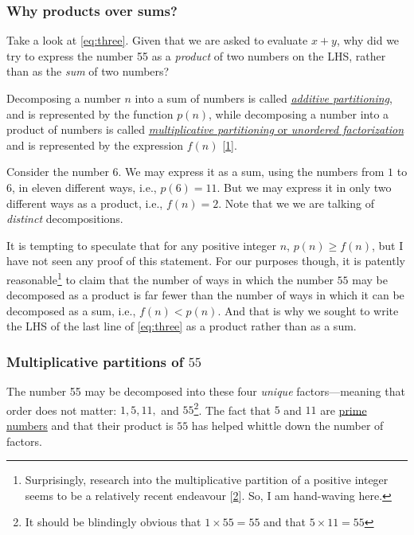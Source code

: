 \documentclass[
  a4paper,
]{article}
\begin{document}
\hypertarget{why-products-over-sums}{%
\subsubsection{Why products over sums?}\label{why-products-over-sums}}

Take a look at \cref{eq:three}. Given that we are asked to evaluate
\(x + y\), why did we try to express the number 55 as a \emph{product}
of two numbers on the LHS, rather than as the \emph{sum} of two numbers?

Decomposing a number \(n\) into a sum of numbers is called
\href{https://mathworld.wolfram.com/Partition.html}{\emph{additive
partitioning}}, and is represented by the function \(p(n)\), while
decomposing a number into a product of numbers is called
\href{https://mathworld.wolfram.com/UnorderedFactorization.html}{\emph{multiplicative
partitioning} or \emph{unordered factorization}} and is represented by
the expression \(f(n)\) {[}\protect\hyperlink{ref-brown-2017}{1}{]}.

Consider the number \(6\). We may express it as a sum, using the numbers
from \(1\) to \(6\), in eleven different ways, i.e., \(p(6) = 11\). But
we may express it in only two different ways as a product, i.e.,
\(f(n)=2\). Note that we we are talking of \emph{distinct}
decompositions.

It is tempting to speculate that for any positive integer \(n\),
\(p(n) \geq f(n)\), but I have not seen any proof of this statement. For
our purposes though, it is patently reasonable\footnote{Surprisingly,
  research into the multiplicative partition of a positive integer seems
  to be a relatively recent endeavour
  {[}\protect\hyperlink{ref-dodd-1987}{2}{]}. So, I am hand-waving here.}
to claim that the number of ways in which the number \(55\) may be
decomposed as a product is far fewer than the number of ways in which it
can be decomposed as a sum, i.e., \(f(n) < p(n)\). And that is why we
sought to write the LHS of the last line of \cref{eq:three} as a product
rather than as a sum.

\hypertarget{multiplicative-partitions-of-55}{%
\subsubsection{\texorpdfstring{Multiplicative partitions of
\(55\)}{Multiplicative partitions of 55}}\label{multiplicative-partitions-of-55}}

The number 55 may be decomposed into these four \emph{unique}
factors---meaning that order does not matter: \(1, 5, 11,\) and
\(55\)\footnote{It should be blindingly obvious that
  \(1 \times 55 = 55\) and that \(5 \times 11 = 55\)
  \normalfont}. The fact that \(5\) and \(11\) are
\href{https://mathworld.wolfram.com/PrimeFactor.html}{prime numbers} and
that their product is \(55\) has helped whittle down the number of
factors.
\end{document}
